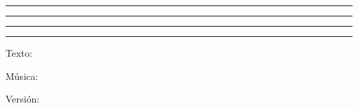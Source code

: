 \begin{titlepage} %
  \vspace*{\baselineskip} %
  \rule{\textwidth}{1.6pt}\vspace*{-\baselineskip}\vspace*{2pt} %
  \rule{\textwidth}{0.4pt} %
  \vspace{0.75\baselineskip} %
  \mytitle
  \vspace{0.75\baselineskip} %
  \rule{\textwidth}{0.4pt}\vspace*{-\baselineskip}\vspace{3.2pt} %
  \rule{\textwidth}{1.6pt} %
  \vspace{5\baselineskip} %

{\Large Texto: \mytext

Música: \mymusic

\vspace{10\baselineskip} %
Versión: \myversion \myversioncomment \\}
\end{titlepage}



